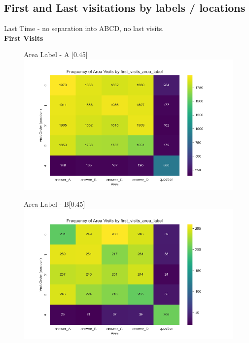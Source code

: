 \documentclass{article}
\begin{document}
\subsection{First and Last visitations by labels / locations}

Last Time - no separation into ABCD, no last visits. 
\\

\textbf{First Visits}

\begin{figure}[H]
  \centering
  \begin{subcaptionbox}{Area Label - A \label{fig:al_a}}[0.45\textwidth]
    {\centering\includegraphics[width=\linewidth]{plots/visits/matrix__first_visits_area_label_hunters_A.png}}
  \end{subcaptionbox}
  \hfill
  \begin{subcaptionbox}{Area Label - B\label{fig:al_b}}[0.45\textwidth]
    {\centering\includegraphics[width=\linewidth]{plots/visits/matrix__first_visits_area_label_hunters_B.png}}
  \end{subcaptionbox}
  

\end{figure}
\end{document}
